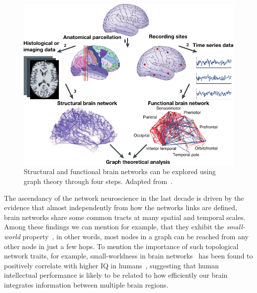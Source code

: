 \begin{figure}[htb!]
\centering
\includegraphics[width=1.0\textwidth]{images/bullmore_2009_pipeline.pdf}
\caption{Structural and functional brain networks can be explored using graph theory through four steps. Adapted from~\cite{bullmore2009}.}
\label{fig:bullmore2009pipeline}
\end{figure}


The ascendancy of the network neuroscience in the last decade is driven by the evidence that almost independently from how the networks links are defined, brain networks share some common tracts at many spatial and temporal scales. 
Among these findings we can mention for example, that they exhibit the \emph{small-world} property~\cite{watts1998,sporns2002,sporns2004a}, in other words, most nodes in a graph can be reached from any other node in just a few hops. To mention the importance of such topological network traits, for example, small-worldness in brain networks~\cite{vandenheuvel2008} has been found to positively correlate with higher IQ in humans~\cite{vandenheuvel2009}, suggesting that human intellectual performance is likely to be related to how efficiently our brain integrates information between multiple brain regions.

